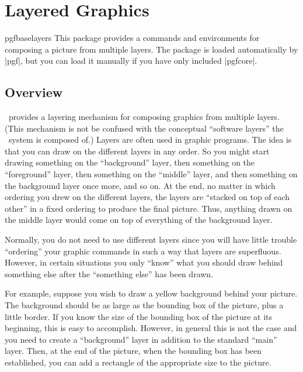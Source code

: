 %
%
%


\section{Layered Graphics}

\label{section-layers}

\begin{package}{pgfbaselayers}
  This package provides a commands and environments for composing a
  picture from multiple layers. The package is loaded automatically by
  |pgf|, but you can load it manually if you have only included
  |pgfcore|.   
\end{package}



\subsection{Overview}

\pgfname\ provides a layering mechanism for composing graphics from
multiple layers. (This mechanism is not be confused with the
conceptual ``software layers'' the \pgfname\ system is composed of.)
Layers are often used in graphic programs. The idea is that you can
draw on the different layers in any order. So you might start drawing
something on the ``background'' layer, then something on the
``foreground'' layer, then something on the ``middle'' layer, and then
something on the background layer once more, and so on. At the end, no
matter in which ordering you drew on the different layers, the layers
are ``stacked on top of each other'' in a fixed ordering to produce
the final picture. Thus, anything drawn on the middle layer would come
on top of everything of the background layer.

Normally, you do not need to use different layers since you will have
little trouble ``ordering'' your graphic commands in such a way that
layers are superfluous. However, in certain situations you only
``know'' what you should draw behind something else after the
``something else'' has been drawn.

For example, suppose you wish to draw a yellow background behind your
picture. The background should be as large as the bounding box of the
picture, plus a little border. If you know the size of the bounding box
of the picture at its beginning, this is easy to accomplish. However,
in general this is not the case and you need to create a
``background'' layer in addition to the standard ``main'' layer. Then,
at the end of the picture, when the bounding box has been established,
you can add a rectangle of the appropriate size to the picture.




